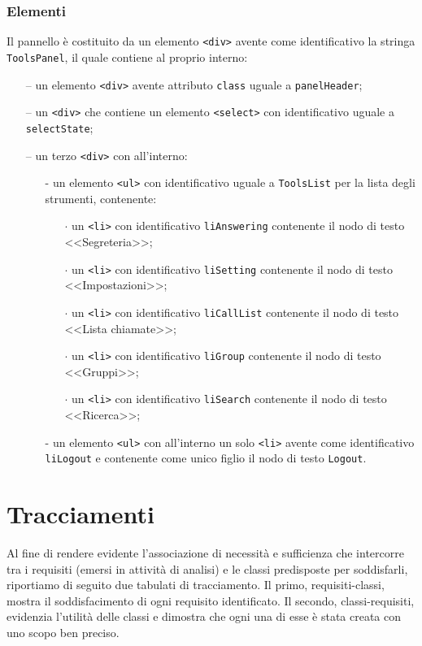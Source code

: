 \subsubsection*{Elementi}
Il pannello è costituito da un elemento \verb'<div>' avente come identificativo la stringa \verb'ToolsPanel', il quale contiene al proprio interno:
\begin{itemize}
  \item[--] un elemento \verb'<div>' avente attributo \verb'class' uguale a \verb'panelHeader';
  \item[--] un \verb'<div>' che contiene un elemento \verb'<select>' con identificativo uguale a \verb'selectState';
  \item[--] un terzo \verb'<div>' con all'interno:
  \begin{itemize}
    \item[-] un elemento \verb'<ul>' con identificativo uguale a \verb'ToolsList' per la lista degli strumenti, contenente:
      \begin{itemize}
        \item[$\cdot$] un \verb'<li>' con identificativo \verb'liAnswering' contenente il nodo di testo <<Segreteria>>;
        \item[$\cdot$] un \verb'<li>' con identificativo \verb'liSetting' contenente il nodo di testo <<Impostazioni>>;
        \item[$\cdot$] un \verb'<li>' con identificativo \verb'liCallList' contenente il nodo di testo  <<Lista chiamate>>;
        \item[$\cdot$] un \verb'<li>' con identificativo \verb'liGroup' contenente il nodo di testo <<Gruppi>>;
        \item[$\cdot$] un \verb'<li>' con identificativo \verb'liSearch' contenente il nodo di testo <<Ricerca>>;
      \end{itemize}
    \item[-] un elemento \verb'<ul>' con all'interno un solo \verb'<li>' avente come identificativo \verb'liLogout' e contenente come unico figlio il nodo di testo \verb'Logout'.
  \end{itemize}
\end{itemize}


\clearpage

\section{Tracciamenti}

Al fine di rendere evidente l'associazione di necessità e sufficienza che intercorre tra i requisiti (emersi in attività di analisi) e le classi predisposte per soddisfarli, riportiamo di seguito due tabulati di tracciamento. Il primo, requisiti-classi, mostra il soddisfacimento di ogni requisito identificato. Il secondo, classi-requisiti, evidenzia l'utilità delle classi e dimostra che ogni una di esse è stata creata con uno scopo ben preciso.

